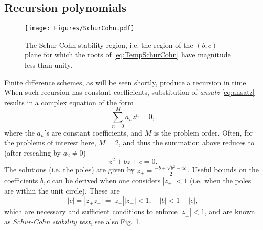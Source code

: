 \documentclass[11pt,twoside,a4paper,english]{book}
\begin{document}
\subsection{Recursion polynomials}
\begin{figure}
\centering
\texttt{[image: Figures/SchurCohn.pdf]}
\caption{The Schur-Cohn stability region, i.e. the region of the $(b,c)-$plane for which the roots of \eqref{eq:TempSchurCohn} have magnitude less than unity.}\label{fig:SchurCohn}
\end{figure}
Finite difference schemes, as will be seen shortly, produce a recursion in time. When such recursion has constant coefficients, substitution of \emph{ansatz} \eqref{eq:ansatz} results in a complex equation of the form
\begin{equation}
    \sum_{n=0}^M a_n z^n = 0,
\end{equation}
where the $a_n$'s are constant coefficients, and $M$ is the problem order. Often, for the problems of interest here, $M=2$, and thus the summation above reduces to (after rescaling by $a_2 \neq 0$)
\begin{equation}\label{eq:TempSchurCohn}
    z^2 + b z + c = 0.
\end{equation}
The solutions (i.e. the poles) are given by $z_\pm = \frac{-b \pm \sqrt{b^2-4 c}}{2}$. Useful bounds on the coefficients $b,c$ can be derived when one considers $|z_\pm|<1$ (i.e. when the poles are within the unit circle). These are
\begin{equation}\label{eq:SchurCohnStab}
    |c| = |z_+ z_-| =  |z_+| |z_-| < 1, \quad |b|<1+|c|,
\end{equation}
which are necessary and sufficient conditions to enforce $|z_\pm|<1$, and are known as \emph{Schur-Cohn stability test}, see also Fig. \ref{fig:SchurCohn}.







\end{document}
